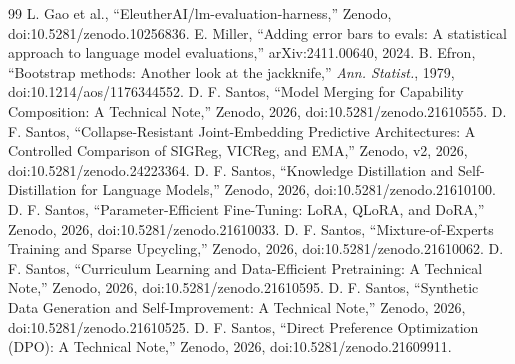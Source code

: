 \documentclass[conference]{IEEEtran}
\begin{document}
\begin{thebibliography}{99}
 L. Gao et al., ``EleutherAI/lm-evaluation-harness,'' Zenodo, doi:10.5281/zenodo.10256836.
 E. Miller, ``Adding error bars to evals: A statistical approach to language model evaluations,'' arXiv:2411.00640, 2024.
 B. Efron, ``Bootstrap methods: Another look at the jackknife,'' \emph{Ann. Statist.}, 1979, doi:10.1214/aos/1176344552.
 D. F. Santos, ``Model Merging for Capability Composition: A Technical Note,'' Zenodo, 2026, doi:10.5281/zenodo.21610555.
 D. F. Santos, ``Collapse-Resistant Joint-Embedding Predictive Architectures: A Controlled Comparison of SIGReg, VICReg, and EMA,'' Zenodo, v2, 2026, doi:10.5281/zenodo.24223364.
 D. F. Santos, ``Knowledge Distillation and Self-Distillation for Language Models,'' Zenodo, 2026, doi:10.5281/zenodo.21610100.
 D. F. Santos, ``Parameter-Efficient Fine-Tuning: LoRA, QLoRA, and DoRA,'' Zenodo, 2026, doi:10.5281/zenodo.21610033.
 D. F. Santos, ``Mixture-of-Experts Training and Sparse Upcycling,'' Zenodo, 2026, doi:10.5281/zenodo.21610062.
 D. F. Santos, ``Curriculum Learning and Data-Efficient Pretraining: A Technical Note,'' Zenodo, 2026, doi:10.5281/zenodo.21610595.
 D. F. Santos, ``Synthetic Data Generation and Self-Improvement: A Technical Note,'' Zenodo, 2026, doi:10.5281/zenodo.21610525.
 D. F. Santos, ``Direct Preference Optimization (DPO): A Technical Note,'' Zenodo, 2026, doi:10.5281/zenodo.21609911.
\end{thebibliography}
\end{document}
